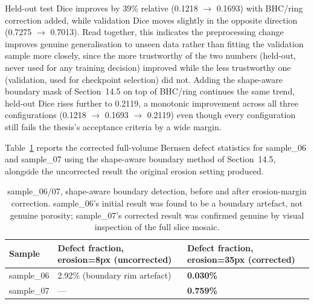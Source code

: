 Held-out test Dice improves by 39\% relative (0.1218 $\to$ 0.1693) with BHC/ring correction added,
while validation Dice moves slightly in the opposite direction (0.7275 $\to$ 0.7013). Read together,
this indicates the preprocessing change improves genuine generalisation to unseen data rather than
fitting the validation sample more closely, since the more trustworthy of the two numbers (held-out,
never used for any training decision) improved while the less trustworthy one (validation, used for
checkpoint selection) did not. Adding the shape-aware boundary mask of Section~14.5 on top of BHC/ring
continues the same trend, held-out Dice rises further to 0.2119, a monotonic improvement across all
three configurations (0.1218 $\to$ 0.1693 $\to$ 0.2119) even though every configuration still fails the
thesis's acceptance criteria by a wide margin.

Table~\ref{tab:podfam_shape_aware} reports the corrected full-volume Bernsen defect statistics for
sample\_06 and sample\_07 using the shape-aware boundary method of Section~14.5, alongside the
uncorrected result the original erosion setting produced.

\begin{table}[htbp]
\centering
\caption{sample\_06/07, shape-aware boundary detection, before and after erosion-margin correction.
  sample\_06's initial result was found to be a boundary artefact, not genuine porosity; sample\_07's
  corrected result was confirmed genuine by visual inspection of the full slice mosaic.}
\label{tab:podfam_shape_aware}
\small
\begin{tabular}{p{2.2cm}p{6.5cm}p{5.5cm}}
\toprule
\textbf{Sample} & \textbf{Defect fraction, erosion=8px (uncorrected)} & \textbf{Defect fraction, erosion=35px (corrected)} \\
\midrule
sample\_06 & 2.92\% (boundary rim artefact) & \textbf{0.030\%} \\
sample\_07 & --- & \textbf{0.759\%} \\
\bottomrule
\end{tabular}
\end{table}


